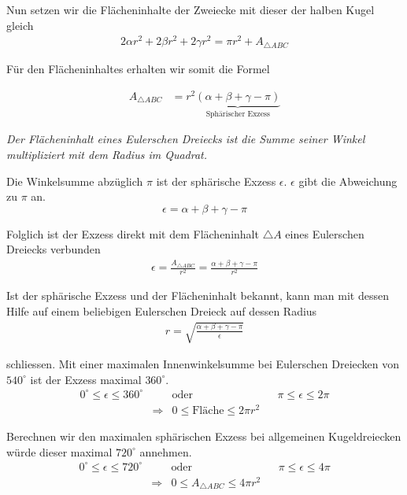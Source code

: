 \begin{refsection}
Nun setzen wir die Flächeninhalte der Zweiecke mit dieser der halben Kugel gleich
\begin{align*}
2 \alpha r^2 + 2 \beta r^2 + 2 \gamma  r^2 = \pi r^2 + A_{ \triangle{ ABC }}
\end{align*}

Für den Flächeninhaltes erhalten wir somit die Formel

\begin{align*}
A_{ \triangle{ ABC }}  &= r^{ 2 }\underbrace{(\alpha + \beta + \gamma - \pi)}_{\text{Sphärischer Exzess}}
\end{align*}

\begin{satz} \textit{Der Flächeninhalt eines Eulerschen Dreiecks ist die Summe seiner Winkel multipliziert mit dem Radius im Quadrat.}
\label{skript:kugel:satz:Flaecheninhalt}
\end{satz}


Die Winkelsumme abzüglich $\pi$ ist der sphärische Exzess $\epsilon$. $\epsilon$ gibt die Abweichung zu $\pi$ an.
\begin{equation}
\epsilon = \alpha + \beta + \gamma - \pi
\end{equation}


Folglich ist der Exzess direkt mit dem Flächeninhalt $\triangle A$ eines Eulerschen Dreiecks verbunden
\begin{align*}
\epsilon =\frac{A_{\triangle{ ABC }}}{r^2} = \frac{\alpha + \beta + \gamma - \pi}{r^2}
\end{align*}

Ist der sphärische Exzess und der Flächeninhalt bekannt, kann man mit dessen Hilfe auf einem beliebigen Eulerschen Dreieck auf dessen Radius
\begin{align*}
r = \sqrt{\frac{\alpha + \beta + \gamma - \pi}{\epsilon}}
\end{align*}

schliessen. Mit einer maximalen Innenwinkelsumme bei Eulerschen Dreiecken von $540^{\circ}$ ist der Exzess maximal $360^{\circ}$.
\[
\begin{aligned}
0^{\circ} \le \epsilon \le 360^{\circ}
&
&\text{oder}
&
&\pi \le \epsilon \le 2\pi \\
&\Rightarrow
& 0 \le \text{Fläche} \le 2 \pi r^2
\end{aligned}
\]

Berechnen wir den maximalen sphärischen Exzess bei allgemeinen Kugeldreiecken würde dieser maximal $720^{\circ}$ annehmen.
\[
\begin{aligned}
0^{\circ} \le \epsilon \le 720^{\circ}
&
&\text{oder}
&
&\pi \le \epsilon \le 4\pi \\
&\Rightarrow
& 0 \le A_{\triangle{ ABC }} \le 4 \pi r^2
\end{aligned}
\]




\end{refsection}
